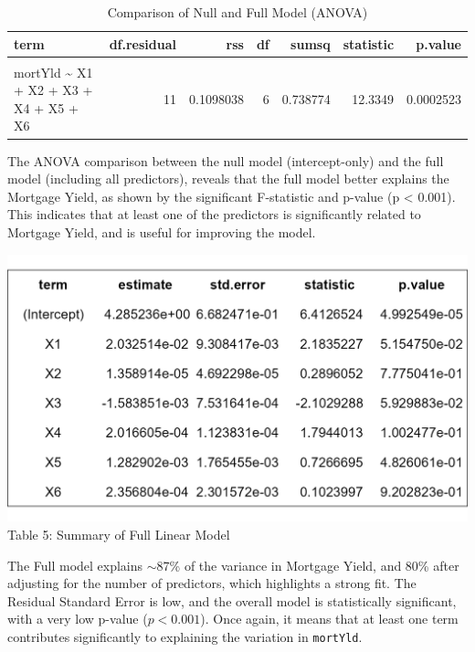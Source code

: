 \documentclass[
  11pt,
]{article}
\begin{document}
\begingroup\fontsize{8}{10}\selectfont

\begin{longtable}[t]{lrrrrrr}
\caption{\label{tab:unnamed-chunk-5}Comparison of Null and Full Model (ANOVA)}\\
\toprule
term & df.residual & rss & df & sumsq & statistic & p.value\\
\midrule
\cellcolor{gray!10}{mortYld \textasciitilde{} 1} & \cellcolor{gray!10}{17} & \cellcolor{gray!10}{0.8485778} & \cellcolor{gray!10}{NA} & \cellcolor{gray!10}{NA} & \cellcolor{gray!10}{NA} & \cellcolor{gray!10}{NA}\\
mortYld \textasciitilde{} X1 + X2 + X3 + X4 + X5 + X6 & 11 & 0.1098038 & 6 & 0.738774 & 12.3349 & 0.0002523\\
\bottomrule
\end{longtable}
\endgroup{}

The ANOVA comparison between the null model (intercept-only) and the
full model (including all predictors), reveals that the full model
better explains the Mortgage Yield, as shown by the significant
F-statistic and p-value (p \textless{} 0.001). This indicates that at
least one of the predictors is significantly related to Mortgage Yield,
and is useful for improving the model.

\begin{minipage}{0.42\textwidth}
\includegraphics[width=1.2\linewidth]{full_model_summary_table.png}\\
\small Table 5: Summary of Full Linear Model
\end{minipage}
\hfill
\begin{minipage}{0.45\textwidth}
\small
The Full model explains $\sim$87\% of the variance in Mortgage Yield, and 80\% after adjusting for the number of predictors, which highlights a strong fit. The Residual Standard Error is low, and the overall model is statistically significant, with a very low p-value ($p < 0.001$). Once again, it means that at least one term contributes significantly to explaining the variation in \texttt{mortYld}.
\end{minipage}
\vspace{0.2em}
\end{document}
